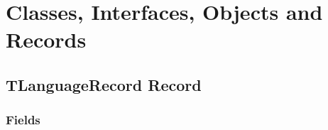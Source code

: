 \documentclass{report}
\newif\ifpdf
\begin{document}
\section{Classes, Interfaces, Objects and Records}
\ifpdf
\subsection*{\large{\textbf{TLanguageRecord Record}}\normalsize\hspace{1ex}\hrulefill}
\else
\subsection*{TLanguageRecord Record}
\fi
\label{PasDoc_Languages.TLanguageRecord}
\subsubsection*{\large{\textbf{Fields}}\normalsize\hspace{1ex}\hfill}
\end{document}
